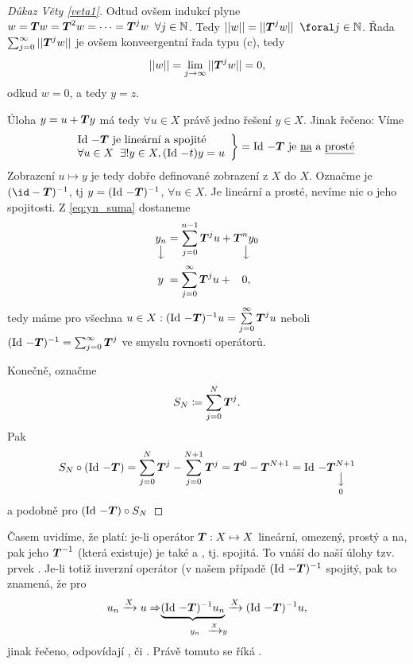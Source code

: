 \begin{proof}[Důkaz Věty \ref{veta1}]
Odtud ovšem indukcí plyne $w= \boldsymbol{T} w= \boldsymbol{T} ^2w=\dots = \boldsymbol{T} ^jw \;\; \forall j\in \mathbb{N}$.  Tedy $||w||=|| \map T ^jw||\;\; \foral j\in \N$. Řada $\sum_{j=0}^\infty|| \boldsymbol{T} ^j w||$ je ovšem konveergentní řada typu (c), tedy 
$$||w||=\lim\limits_{j\rightarrow\infty}|| \boldsymbol{T} ^jw||=0,$$
odkud $w=0$, a tedy $y=z$.

Úloha $y=u+ \boldsymbol{T} y$ má tedy $\forall u\in X$ právě jedno řešení $y\in X$. Jinak řečeno: Víme \begin{equation*}
    \begin{split}
        \left.
    \begin{array}{ll}
        &\operatorname{Id}\,- \boldsymbol{T}  \text{ je lineární a spojité} \\
        &\forall u\in X\;\;\exists ! y\in X, (\operatorname{Id}\,-t)y=u
    \end{array}
        \right \}=\operatorname{Id}\,- \boldsymbol{T}  \text{ je \underline{na} a \underline{prosté}}
    \end{split}
\end{equation*}
Zobrazení $u\mapsto y$ je tedy dobře definované zobrazení z $X$ do $X$. Označme je $(\id - \map T )^{-1}$, tj $y=(\operatorname{Id}\,- \boldsymbol{T} )^{-1}$, $\forall u\in X$. Je lineární a prosté, nevíme nic o jeho spojitosti.
Z \ref{eq:yn_suma} dostaneme 
\begin{equation*}
    \begin{split}
        \underset{\big\downarrow}{y_n} &= \sum\limits_{j=0}^{n-1} \boldsymbol{T} ^ju+\underset{\big\downarrow}{ \boldsymbol{T} ^ny_0}\\
        y\;&=\sum\limits_{j=0}^\infty  \boldsymbol{T} ^ju+\;\;\;0,
    \end{split}
\end{equation*}
tedy máme pro všechna $u\in X: (\operatorname{Id}\,- \boldsymbol{T} )^{-1}u=\sum\limits_{j=0}^\infty  \boldsymbol{T} ^ju$ neboli $(\operatorname{Id}\,- \boldsymbol{T} )^{-1}=\sum_{j=0}^\infty  \boldsymbol{T} ^j$ ve smyslu rovnosti operátorů.

Konečně, označme
$$S_N\coloneqq \sum\limits_{j=0}^N  \boldsymbol{T} ^j.$$
Pak 
$$S_N\circ(\operatorname{Id}\,- \boldsymbol{T} )=\sum\limits_{j=0}^N  \boldsymbol{T} ^j-\sum\limits_{j=0}^{N+1}  \boldsymbol{T} ^j =  \boldsymbol{T} ^0- \boldsymbol{T} ^{N+1}=\operatorname{Id}\,-\underset{0}{\underset{\big\downarrow}{ \boldsymbol{T} ^{N+1}}}$$
a podobně pro $(\operatorname{Id}\,- \boldsymbol{T} )\circ S_N$
\end{proof}

\Poznamka
Časem uvidíme, že platí: je-li operátor $ \boldsymbol{T} :X\mapsto X$ lineární, omezený, prostý a na, pak jeho  $ \boldsymbol{T} ^{-1}$ (která existuje) je také  a , tj. spojitá. To vnáší do naší úlohy tzv. prvek . Je-li totiž inverzní operátor (v našem případě $(\operatorname{Id}\,- \boldsymbol{T} )^{-1}$ spojitý, pak to znamená, že pro 
$$u_n\xrightarrow{X}u\Rightarrow \underset{\quad\; y_n\;\;\;\xrightarrow{X}y}{\underbrace{(\operatorname{Id}\,- \boldsymbol{T} )^{-1}u_n}\xrightarrow{X}}(\operatorname{Id}\,- \boldsymbol{T} )^{-1}u,$$
jinak řečeno,  odpovídají , či . Právě tomuto se říká .

